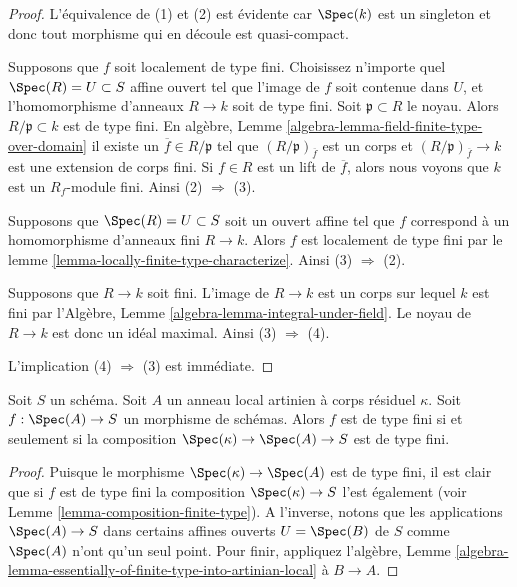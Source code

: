 \begin{proof}
L'équivalence de (1) et (2) est évidente car $\Spec(k)$ est un
singleton et donc tout morphisme qui en découle est quasi-compact.

\medskip\noindent
Supposons que $f$ soit localement de type fini.
Choisissez n'importe quel $\Spec(R) = U \subset S$ affine
ouvert tel que l'image de $f$ soit
contenue dans $U$, et l'homomorphisme d'anneaux
$R \to k$ soit de type fini. Soit $\mathfrak p \subset R$
le noyau. Alors $R/\mathfrak p \subset k$ est de type fini. En algèbre,
Lemme \ref{algebra-lemma-field-finite-type-over-domain} il existe un $\overline{f} \in R/\mathfrak p$ tel que
$(R/\mathfrak p)_{\overline{f}}$ est un corps et $(R/\mathfrak p)_{\overline{f}} \to k$ est
une extension de corps fini. Si $f \in R$ est un
lift de $\overline{f}$, alors nous voyons que $k$
est un $R_f$-module fini. Ainsi (2) $\Rightarrow$ (3).

\medskip\noindent
Supposons que $\Spec(R) = U \subset S$ soit un ouvert affine tel que
$f$ correspond à un homomorphisme d'anneaux fini
$R \to k$. Alors $f$ est
localement de type fini par le lemme \ref{lemma-locally-finite-type-characterize}.
Ainsi (3) $\Rightarrow$ (2).

\medskip\noindent
Supposons que $R \to k$ soit fini. L'image de $R \to k$ est
un corps sur lequel $k$
est fini par l'Algèbre, Lemme \ref{algebra-lemma-integral-under-field}. Le
noyau de $R \to k$ est donc un idéal maximal. Ainsi
(3) $\Rightarrow$ (4).

\medskip\noindent
L'implication (4) $\Rightarrow$ (3) est immédiate.
\end{proof}

\begin{lemma}
\label{lemma-artinian-finite-type}
Soit $S$ un schéma.
Soit $A$ un anneau local artinien à corps résiduel
$\kappa$. Soit $f : \Spec(A) \to S$ un morphisme de
schémas. Alors $f$ est de type fini si et seulement
si la composition $\Spec(\kappa) \to \Spec(A) \to S$ est de type fini.
\end{lemma}

\begin{proof}
Puisque le morphisme $\Spec(\kappa) \to \Spec(A)$ est de type fini, il
est clair que si $f$ est de type fini la composition
$\Spec(\kappa) \to S$ l'est également (voir Lemme \ref{lemma-composition-finite-type}). A l'inverse,
notons que les applications $\Spec(A) \to S$ dans certains affines
ouverts $U = \Spec(B)$ de $S$ comme $\Spec(A)$ n'ont
qu'un seul point.
Pour finir, appliquez l'algèbre, Lemme \ref{algebra-lemma-essentially-of-finite-type-into-artinian-local} à
$B \to A$.
\end{proof}

